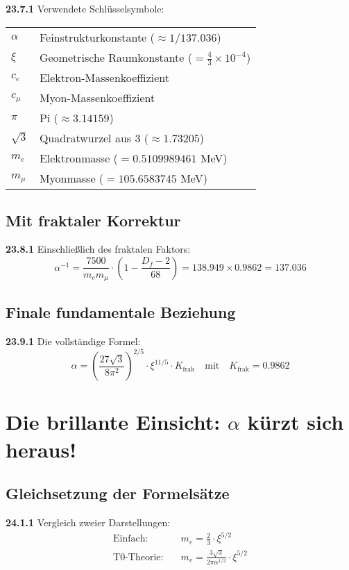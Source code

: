 \documentclass[12pt,a4paper]{article}
\begin{document}
\noindent \textbf{23.7.1} Verwendete Schlüsselsymbole:

\begin{tabular}{ll}
	$\alpha$ & Feinstrukturkonstante ($\approx 1/137.036$) \\
	$\xi$ & Geometrische Raumkonstante ($= \frac{4}{3} \times 10^{-4}$) \\
	$c_e$ & Elektron-Massenkoeffizient \\
	$c_\mu$ & Myon-Massenkoeffizient \\
	$\pi$ & Pi ($\approx 3.14159$) \\
	$\sqrt{3}$ & Quadratwurzel aus 3 ($\approx 1.73205$) \\
	$m_e$ & Elektronmasse ($= 0.5109989461$ MeV) \\
	$m_\mu$ & Myonmasse ($= 105.6583745$ MeV) \\
\end{tabular}

\subsection{Mit fraktaler Korrektur}

\noindent \textbf{23.8.1} Einschließlich des fraktalen Faktors:
\[
\alpha^{-1} = \frac{7500}{m_e m_\mu} \cdot \left(1 - \frac{D_f - 2}{68}\right) = 138.949 \times 0.9862 = 137.036
\]

\subsection{Finale fundamentale Beziehung}

\noindent \textbf{23.9.1} Die vollständige Formel:
\[
\boxed{
	\alpha = \left(\frac{27\sqrt{3}}{8\pi^2}\right)^{2/5} \cdot \xi^{11/5} \cdot K_{\text{frak}}
}
\quad \text{mit} \quad K_{\text{frak}} = 0.9862
\]	


\section{Die brillante Einsicht: $\alpha$ kürzt sich heraus!}

\subsection{Gleichsetzung der Formelsätze}

\noindent \textbf{24.1.1} Vergleich zweier Darstellungen:
\begin{align*}
	\text{Einfach:} &\quad m_e = \frac{2}{3} \cdot \xi^{5/2} \\
	\text{T0-Theorie:} &\quad m_e = \frac{3\sqrt{3}}{2\pi\alpha^{1/2}} \cdot \xi^{5/2}
\end{align*}
\end{document}

